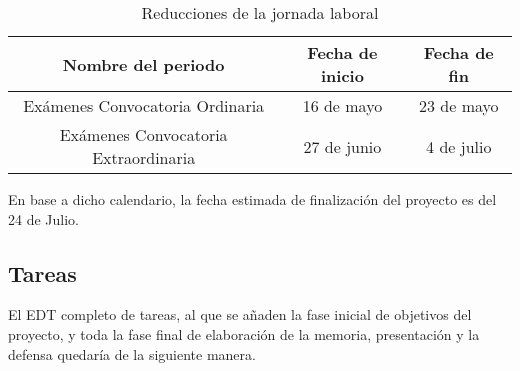 \begin{table}[H]
	\centering
	\begin{tabular}{ |c|c|c| } 
		\hline
		Nombre del periodo & Fecha de inicio & Fecha de fin \\
		\hline
		Exámenes Convocatoria Ordinaria & 16 de mayo & 23 de mayo \\
		Exámenes Convocatoria Extraordinaria & 27 de junio & 4 de julio \\
		\hline
	\end{tabular}
	\caption{Reducciones de la jornada laboral}
	\label{table:reduccion-jornada}
\end{table}

En base a dicho calendario, la fecha estimada de finalización del proyecto es del 24 de Julio.

\subsection{Tareas}
El EDT completo de tareas, al que se añaden la fase inicial de objetivos del proyecto, y toda la fase final de elaboración de la memoria, presentación y la defensa quedaría de la siguiente manera.
